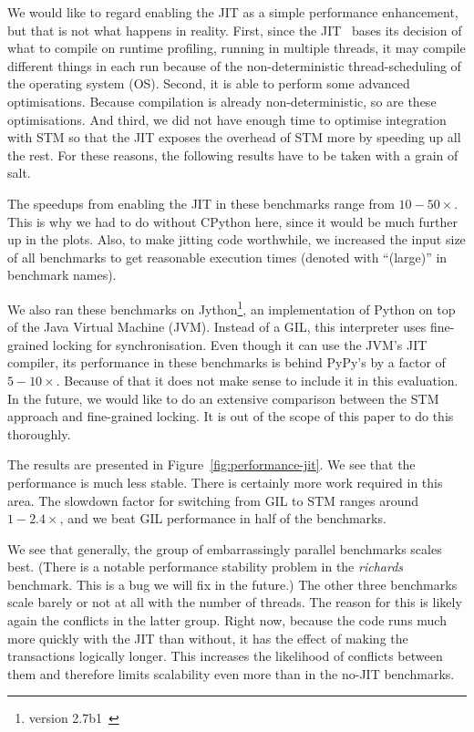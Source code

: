 \documentclass{sigplanconf}
\begin{document}
We would like to regard enabling the JIT as a simple performance
enhancement, but that is not what happens in reality. First, since the
JIT~\cite{cfbolz09} bases its decision of what to compile on runtime
profiling, running in multiple threads, it may compile different
things in each run because of the non-deterministic thread-scheduling
of the operating system (OS). Second, it is able to perform some
advanced optimisations. Because compilation is already non-deterministic,
so are these optimisations. And third, we did
not have enough time to optimise integration with STM so that the JIT
exposes the overhead of STM more by speeding up all the rest.
For these reasons, the following results have to be taken with a grain
of salt.

The speedups from enabling the JIT in these benchmarks range from
$10-50\times$. This is why we had to do without CPython here, since it
would be much further up in the plots. Also, to make jitting
code worthwhile, we increased the input size of all benchmarks to get
reasonable execution times (denoted with ``(large)'' in benchmark names).

We also ran these benchmarks on Jython\footnote{version
2.7b1~\cite{webjython}}, an implementation of Python on top of the
Java Virtual Machine (JVM).  Instead of a GIL, this interpreter uses
fine-grained locking for synchronisation. Even though it can use the
JVM's JIT compiler, its performance in these benchmarks is behind
PyPy's by a factor of $5-10\times$. Because of that it does not
make sense to include it in this evaluation. In the future, we would
like to do an extensive comparison between the STM approach and
fine-grained locking. It is out of the scope of this paper to do
this thoroughly.

The results are presented in Figure~\ref{fig:performance-jit}. We
see that the performance is much less stable. There is certainly more
work required in this area. The slowdown factor for switching from GIL
to STM ranges around $1-2.4\times$, and we beat GIL performance
in half of the benchmarks.

We see that generally, the group of embarrassingly parallel benchmarks
scales best. (There is a notable performance stability problem in the
\emph{richards} benchmark. This is a bug we will fix in the future.)
The other three benchmarks scale barely or not at all with the number of
threads. The reason for this is likely again the conflicts in the
latter group. Right now, because the code runs much more quickly with
the JIT than without, it has the effect of making the transactions
logically longer.  This increases the
likelihood of conflicts between them and therefore limits scalability
even more than in the no-JIT benchmarks.
\end{document}

